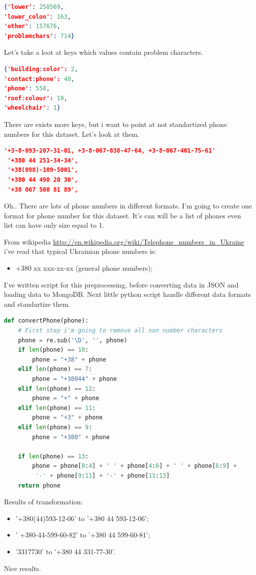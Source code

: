 \documentclass[a4paper,12pt,twoside]{book}
\begin{document}
\begin{lstlisting}[language=json,firstnumber=1]
{'lower': 258569,
'lower_colon': 163,
'other': 157676,
'problemchars': 714}
\end{lstlisting}
Let's take a loot at keys which values contain problem characters.
\begin{lstlisting}[language=json,firstnumber=1]
{'building:color': 2,
'contact:phone': 40,
'phone': 558,
'roof:colour': 19,
'wheelchair': 1}
\end{lstlisting}
There are exists more keys, but i want to point at not standartized phone numbers for this dataset. Let's look at them.
\begin{lstlisting}[language=json, firstnumber=1]
'+3-8-093-207-31-01, +3-8-067-838-47-64, +3-8-067-401-75-61'
 '+380 44 251-34-34',
 '+38(098)-109-5001',
 '+380 44 490 20 30',
 '+38 067 500 81 89',
\end{lstlisting}
Oh.. There are lots of phone numbers in different formats. I'm going to create one format for phone number for this dataset. It's can will be a list of phones even list can have only size equal to 1.\par
From wikipedia \url{http://en.wikipedia.org/wiki/Telephone_numbers_in_Ukraine} i've read that typical Ukrainian phone numbers is:
\begin{itemize}
\item +380 xx xxx-xx-xx (general phone numbers);
\end{itemize}
I've written script for this preprocessing, before converting data in JSON and loading data to MongoDB. Next little python script handle different data formats and standartize them.
\begin{lstlisting}[language=python, firstnumber=1]
def convertPhone(phone):
    # First step i'm going to remove all non number characters
    phone = re.sub('\D', '', phone)
    if len(phone) == 10:
        phone = "+38" + phone
    elif len(phone) == 7:
        phone = "+38044" + phone
    elif len(phone) == 12:
        phone = "+" + phone
    elif len(phone) == 11:
        phone = "+3" + phone
    elif len(phone) == 9:
        phone = "+380" + phone

    if len(phone) == 13:
        phone = phone[0:4] + ' ' + phone[4:6] + ' ' + phone[6:9] +
         '-' + phone[9:11] + '-' + phone[11:13]
    return phone
\end{lstlisting} 
Results of transformation:
\begin{itemize}
\item '+380(44)593-12-06' to '+380 44 593-12-06';
\item ' +380-44-599-60-82' to '+380 44 599-60-81';
\item '3317730' to '+380 44 331-77-30'.
\end{itemize}
Nice results.
\end{document}
